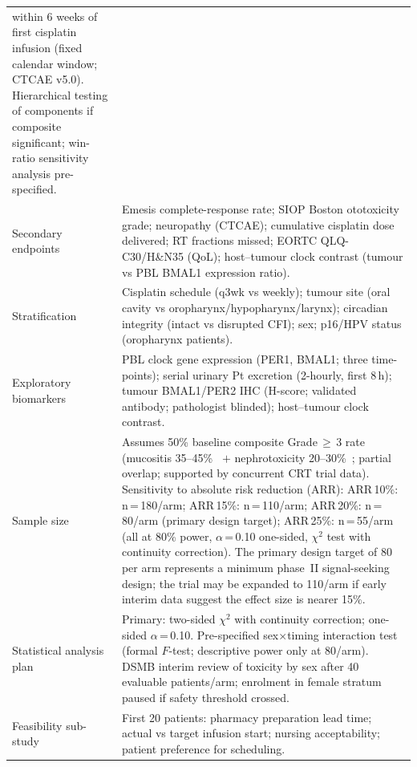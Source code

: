 \documentclass[preprint,review,12pt]{elsarticle}
\renewcommand{\arraystretch}{1.18}
\newenvironment{compactsidewaystable}
  {\begin{table}\centering\scriptsize
   \setlength{\tabcolsep}{3pt}\renewcommand{\arraystretch}{1.08}}
  {\end{table}}
\begin{document}
\begin{compactsidewaystable}
\begin{tabularx}{0.95\textheight}{L{3.0cm} Y}
  within 6 weeks of first cisplatin infusion (fixed calendar window;
  CTCAE v5.0). Hierarchical testing of components if composite significant;
  win-ratio sensitivity analysis pre-specified. \\
\addlinespace
Secondary endpoints &
  Emesis complete-response rate; SIOP Boston ototoxicity grade;
  neuropathy (CTCAE); cumulative cisplatin dose delivered; RT fractions
  missed; EORTC QLQ-C30/H\&N35 (QoL); host--tumour clock contrast
  (tumour vs PBL BMAL1 expression ratio). \\
\addlinespace
Stratification &
  Cisplatin schedule (q3wk vs weekly); tumour site (oral cavity vs
  oropharynx/hypopharynx/larynx); circadian integrity (intact vs disrupted
  CFI); sex; p16/HPV status (oropharynx patients). \\
\addlinespace
Exploratory biomarkers &
  PBL clock gene expression (PER1, BMAL1; three time-points); serial
  urinary Pt excretion (2-hourly, first 8\,h); tumour BMAL1/PER2 IHC
  (H-score; validated antibody; pathologist blinded); host--tumour clock
  contrast. \\
\addlinespace
Sample size &
  Assumes 50\% baseline composite Grade\,$\geq$\,3 rate (mucositis
  35--45\%~\cite{Lalla2014} $+$ nephrotoxicity 20--30\%~\cite{Manohar2018};
  partial overlap; supported by concurrent CRT trial data). Sensitivity to
  absolute risk reduction (ARR): ARR\,10\%: n\,=\,180/arm; ARR\,15\%:
  n\,=\,110/arm; ARR\,20\%: n\,=\,80/arm (primary design target);
  ARR\,25\%: n\,=\,55/arm (all at 80\% power, $\alpha$\,=\,0.10 one-sided,
  $\chi^2$ test with continuity correction). The primary design target of
  80 per arm represents a minimum phase~II signal-seeking design; the trial
  may be expanded to 110/arm if early interim data suggest the effect size
  is nearer 15\%. \\
\addlinespace
Statistical analysis plan &
  Primary: two-sided $\chi^2$ with continuity correction; one-sided
  $\alpha$\,=\,0.10. Pre-specified sex$\times$timing interaction test
  (formal $F$-test; descriptive power only at 80/arm). DSMB interim review
  of toxicity by sex after 40 evaluable patients/arm; enrolment in female
  stratum paused if safety threshold crossed. \\
\addlinespace
Feasibility sub-study &
  First 20 patients: pharmacy preparation lead time; actual vs target
  infusion start; nursing acceptability; patient preference for scheduling. \\
\bottomrule
\end{tabularx}
\end{compactsidewaystable}
\end{document}
